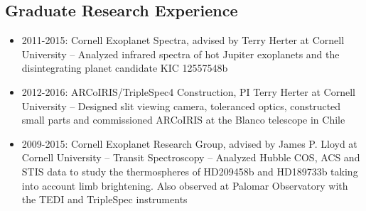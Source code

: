 \documentclass[11pt, oneside]{article}   	%
\begin{document}
\subsection*{Graduate Research Experience}
\begin{itemize}[noitemsep]
	\item 2011-2015: Cornell Exoplanet Spectra, advised by Terry Herter at Cornell University -- Analyzed infrared spectra of hot Jupiter exoplanets and the disintegrating planet candidate KIC 12557548b
	\item 2012-2016: ARCoIRIS/TripleSpec4 Construction, PI Terry Herter at Cornell University -- Designed slit viewing camera, toleranced optics, constructed small parts and commissioned ARCoIRIS at the Blanco telescope in Chile
	\item 2009-2015: Cornell Exoplanet Research Group, advised by James P. Lloyd at Cornell University -- Transit Spectroscopy -- Analyzed Hubble COS, ACS and STIS data to study the thermospheres of HD209458b and HD189733b taking into account limb brightening. Also observed at Palomar Observatory with the TEDI and TripleSpec instruments
\end{itemize}

\end{document}

